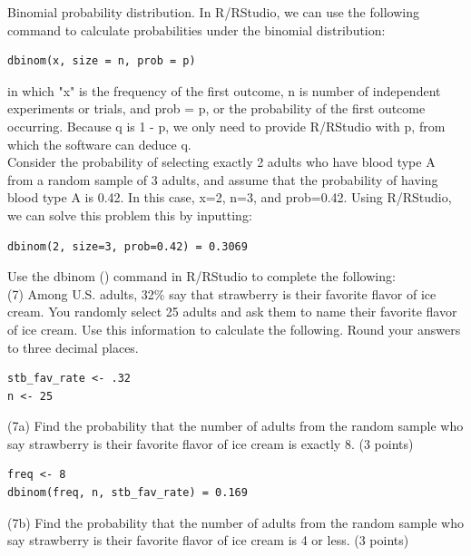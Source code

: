 \documentclass{article}
\begin{document}
Binomial probability distribution. In R/RStudio, we can use the following command to calculate probabilities under the binomial distribution:
\begin{center}
\begin{lstlisting}
dbinom(x, size = n, prob = p)
\end{lstlisting}
\end{center}

in which "x" is the frequency of the first outcome, n is number of independent experiments or trials, and prob = p, or the probability of the first outcome occurring. Because q is 1 - p, we only need to provide R/RStudio with p, from which the software can deduce q.\\

Consider the probability of selecting exactly 2 adults who have blood type A from a random sample of 3 adults, and assume that the probability of having blood type A is 0.42. In this case, x=2, n=3, and prob=0.42. Using R/RStudio, we can solve this problem this by inputting:
\begin{center}
\begin{lstlisting}
dbinom(2, size=3, prob=0.42) = 0.3069
\end{lstlisting}
\end{center}


Use the dbinom () command in R/RStudio to complete the following:\\

(7) Among U.S. adults, 32\% say that strawberry is their favorite flavor of ice cream. You randomly select 25 adults and ask them to name their favorite flavor of ice cream. Use this information to calculate the following. Round your answers to three decimal places.

\begin{center}
\begin{lstlisting}
stb_fav_rate <- .32
n <- 25
\end{lstlisting}
\end{center}

(7a) Find the probability that the number of adults from the random sample who say strawberry is their favorite flavor of ice cream is exactly 8. (3 points)
\begin{center}
\begin{lstlisting}
freq <- 8
dbinom(freq, n, stb_fav_rate) = 0.169
\end{lstlisting}
\end{center}

(7b) Find the probability that the number of adults from the random sample who say strawberry is their favorite flavor of ice cream is 4 or less. (3 points)\\
\end{document}

